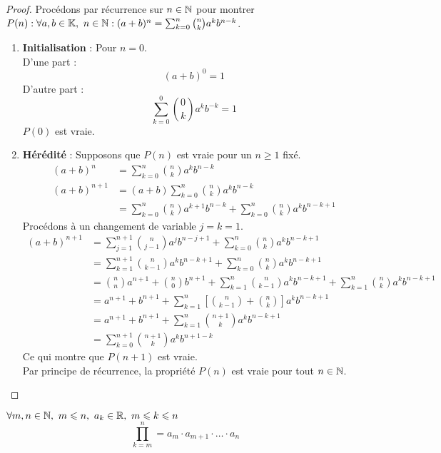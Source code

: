 \begin{proof}
	Procédons par récurrence sur $n \in \mathbb{N}$ pour montrer $P(n) : \forall a, b \in \mathbb{K},\ n \in \mathbb{N} : (a + b)^n = \sum_{k = 0}^{n} \binom{n}{k} a^kb^{n-k}$.
	\begin{enumerate}
		\item \textbf{Initialisation} : Pour $n = 0$.
		\\
		D'une part :
		\[ (a + b)^0 = 1 \]
		D'autre part :
		\[ \sum_{k = 0}^{0} \binom{0}{k} a^k b^{-k} = 1 \]
		$P(0)$ est vraie.
		\item \textbf{Hérédité} : Supposons que $P(n)$ est vraie pour un $n \geq 1$ fixé.
		\\
		\begin{align*}
			(a + b)^n &= \sum_{k=0}^{n} \binom{n}{k} a^k b^{n-k} \\
			(a + b)^{n+1} &= (a+b) \sum_{k=0}^{n} \binom{n}{k} a^k b^{n-k} \\
			&= \sum_{k = 0}^{n} \binom{n}{k} a^{k+1} b^{n-k} + \sum_{k=0}^{n} \binom{n}{k} a^k b^{n - k + 1}
		\end{align*}
		Procédons à un changement de variable $j = k = 1$.
		\begin{align*}
			(a + b)^{n+1} &= \sum_{j = 1}^{n + 1} \binom{n}{j - 1} a^j b^{n - j + 1} + \sum_{k = 0}^{n} \binom{n}{k} a^k b^{n-k+1} \\
			&= \sum_{k = 1}^{n + 1} \binom{n}{k - 1} a^k b^{n - k + 1} + \sum_{k = 0}^{n} \binom{n}{k} a^k b^{n - k + 1} \\
			&= \binom{n}{n} a^{n+1} + \binom{n}{0} b^{n+1} + \sum_{k = 1}^{n} \binom{n}{k - 1} a^k b^{n - k + 1} + \sum_{k = 1}^{n} \binom{n}{k} a^k b^{n - k + 1} \\
			&= a^{n+1} + b^{n+1} + \sum_{k = 1}^{n} \left[ \binom{n}{k - 1} + \binom{n}{k} \right] a^k b^{n - k + 1} \\
			&= a^{n+1} + b^{n+1} + \sum_{k=1}^{n} \binom{n+1}{k} a^k b^{n - k + 1} \\
			&= \sum_{k=0}^{n+1} \binom{n + 1}{k} a^k b^{n + 1 - k}
		\end{align*}
		Ce qui montre que $P(n+1)$ est vraie. 
		\\
		Par principe de récurrence, la propriété $P(n)$ est vraie pour tout $n \in \mathbb{N}$.
	\end{enumerate}
\end{proof}

\begin{definition}[Produit]
    $\forall m, n \in \mathbb{N},\ m \leqslant n,\ a_k \in \mathbb{R},\ m \leqslant k \leqslant n$
    \[ \prod_{k = m}^{n} = a_m \cdot a_{m+1} \cdot \ldots \cdot a_n \]
\end{definition}